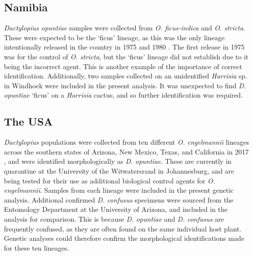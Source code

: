 \subsection{Namibia}
\textit{Dactylopius opuntiae} samples were collected from \textit{O. ficus-indica} and \textit{O. stricta}. These were expected to be the `ficus' lineage, as this was the only lineage intentionally released in the country in 1975 and 1980 \citep{brown1985invasive, paterson2019prospects}. The first release in 1975 was for the control of \textit{O. stricta}, but the `ficus' lineage did not establish \citep{brown1985invasive} due to it being the incorrect agent. This is another example of the importance of correct identification. Additionally, two samples collected on an unidentified \textit{Harrisia} sp. in Windhoek were included in the present analysis. It was unexpected to find \textit{D. opuntiae} `ficus' on a \textit{Harrisia} cactus, and so further identification was required. 
\subsection{The USA}
\textit{Dactylopius} populations were collected from ten different \textit{O. engelmannii} lineages across the southern states of Arizona, New Mexico, Texas, and California in 2017 \citep{isbcw2018byrne}, and were identified morphologically as \textit{D. opuntiae}. These are currently in quarantine at the University of the Witwatersrand in Johannesburg, and are being tested for their use as additional biological control agents for \textit{O. engelmannii}. Samples from each lineage were included in the present genetic analysis.
Additional confirmed \textit{D. confusus} specimens were sourced from the Entomology Department at the University of Arizona, and included in the analysis for comparison. This is because \textit{D. opuntiae} and \textit{D. confusus} are frequently confused, as they are often found on the same individual host plant. Genetic analyses could therefore confirm the morphological identifications made for these ten lineages.

